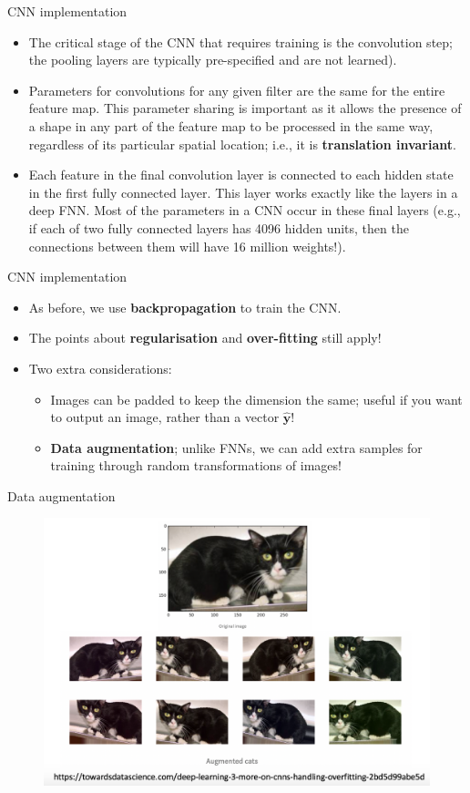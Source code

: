 \documentclass{beamer}
\begin{document}
\begin{frame}{CNN implementation}
\begin{itemize}
\item The critical stage of the CNN that requires training is the convolution step; the pooling layers are typically pre-specified and are not learned).
\item Parameters for convolutions for any given filter are the same for the entire feature map. This parameter sharing is important as it allows the presence of a shape in any part of the feature map to be processed in the same way, regardless of its particular spatial location; i.e., it is \textbf{translation invariant}.
\item Each feature in the final convolution layer is connected to each hidden state in the first fully connected layer. This layer works exactly like the layers in a deep FNN. Most of the parameters in a CNN occur in these final layers (e.g., if each of two fully connected layers has 4096 hidden units, then the connections between them will have 16 million weights!).
\end{itemize}
\end{frame}

\begin{frame}{CNN implementation}
\begin{itemize}
\item As before, we use \textbf{backpropagation} to train the CNN.
\item The points about \textbf{regularisation} and \textbf{over-fitting} still apply!
\item Two extra considerations:
\begin{itemize}
\item Images can be padded to keep the dimension the same; useful if you want to output an image, rather than a vector $\hat{\mathbf{y}}$!
\item \textbf{Data augmentation}; unlike FNNs, we can add extra samples for training through random transformations of images!
\end{itemize}
\end{itemize}
\end{frame}
\begin{frame}{Data augmentation}
\begin{figure}
\includegraphics[width=0.9\linewidth]{Images/cat.png}
\end{figure}
\end{frame}
\end{document}

